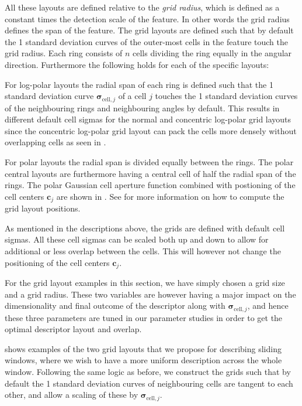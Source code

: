 \documentclass[thesis.tex]{subfiles}
\def\c{\mathbf{c}}
\def\sigmacellj{\boldsymbol{\sigma}_{\text{cell},j}}
\begin{document}
All these layouts are defined relative to the \emph{grid radius}, which is defined as a constant times the detection scale of the feature. In other words the grid radius defines the span of the feature. The grid layouts are defined such that by default the 1 standard deviation curves of the outer-most cells in the feature touch the grid radius. Each ring consists of $n$ cells dividing the ring equally in the angular direction. Furthermore the following holds for each of the specific layouts:

For log-polar layouts the radial span of each ring is defined such that the 1 standard deviation curve $\sigmacellj$ of a cell $j$ touches the 1 standard deviation curves of the neighbouring rings and neighbouring angles by default. This results in different default cell sigmas for the normal and concentric log-polar grid layouts since the concentric log-polar grid layout can pack the cells more densely without overlapping cells as seen in .

For polar layouts the radial span is divided equally between the rings. The polar central layouts are furthermore having a central cell of half the radial span of the rings. The polar Gaussian cell aperture function combined with postioning of the cell centers $\c_j$ are shown in .
See  for more information on how to compute the grid layout positions.

As mentioned in the descriptions above, the grids are defined with default cell sigmas. All these cell sigmas can be scaled both up and down to allow for additional or less overlap between the cells. This will however not change the positioning of the cell centers $\c_j$.

For the grid layout examples in this section, we have simply chosen a grid size and a grid radius. These two variables are however having a major impact on the dimensionality and final outcome of the descriptor along with $\sigmacellj$, and hence these three parameters are tuned in our parameter studies in order to get the optimal descriptor layout and overlap.

 shows examples of the two grid layouts that we propose for describing sliding windows, where we wish to have a more uniform description across the whole window. Following the same logic as before, we construct the grids such that by default the 1 standard deviation curves of neighbouring cells are tangent to each other, and allow a scaling of these by $\sigmacellj$.
\end{document}
